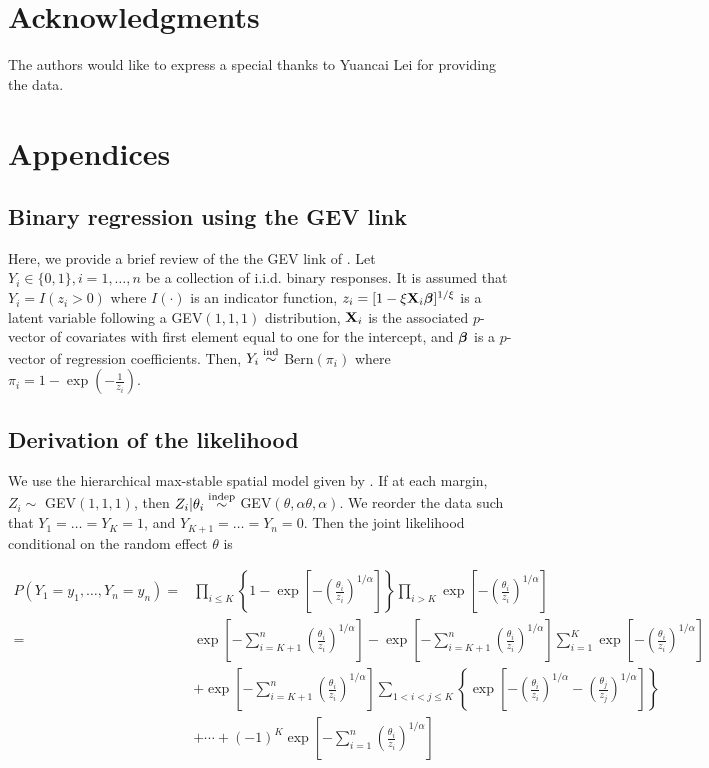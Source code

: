 \documentclass[12pt]{article}
\begin{document}
\section*{Acknowledgments}
The authors would like to express a special thanks to Yuancai Lei for providing the data.

\appendix
\section{Appendices}
\subsection{Binary regression using the GEV link} \label{rba:rarebinary}
Here, we provide a brief review of the the GEV link of \citet{Wang2010}.
Let $Y_i \in \{0, 1\}, i = 1, \ldots, n$ be a collection of i.i.d. binary responses.
It is assumed that $Y_i = I(z_i > 0)$ where $I(\cdot)$ is an indicator function, $z_i = [1 - \xi \mathbf{X}_i \mbox{\boldmath $\beta$}]^{1 / \xi}$ is a latent variable following a GEV$(1, 1, 1)$ distribution, $\mathbf{X}_i$ is the associated $p$-vector of covariates with first element equal to one for the intercept, and $\mbox{\boldmath $\beta$}$ is a $p$-vector of regression coefficients.
Then, $Y_i \stackrel{\mathrm{ind}}{\sim}$ Bern$(\pi_i)$ where $\pi_i= 1 - \exp \left( -\frac{ 1 }{ z_i } \right)$.


\subsection{Derivation of the likelihood} \label{rba:likelihoodderivation}
We use the hierarchical max-stable spatial model given by \citet{Reich2012}. If at each margin, $Z_i \sim $ GEV$(1,1,1)$, then $Z_i | \theta_i \stackrel{\text{indep}}{\sim} $ GEV$(\theta, \alpha \theta, \alpha)$. We reorder the data such that $Y_1=\ldots=Y_K=1$, and $Y_{K+1} = \ldots = Y_n = 0$. Then the joint likelihood conditional on the random effect $\theta$ is

\begin{align} \label{rbeq:joint_cond}
	P(Y_1=y_1,\ldots,Y_n=y_n) =& \prod_{ i \le K } \left\{ 1 - \exp \left[ - \left( \frac{ \theta_i }{ z_i } \right)^{ 1/\alpha} \right] \right \} \prod_{ i > K } \exp \left[ -\left( \frac{ \theta_i }{ z_i } \right)^{1/\alpha} \right] \nonumber \\[0.5em]
		=& \exp \left[ -\sum_{ i = K+1}^{ n }\left( \frac{ \theta_i }{ z_i } \right)^{1/\alpha} \right] - \exp \left[ -\sum_{ i = K+1}^{ n }\left( \frac{ \theta_i }{ z_i } \right)^{1/\alpha} \right] \sum_{ i = 1}^{K} \exp\left[ -\left( \frac{ \theta_i }{ z_i } \right)^{ 1/\alpha} \right] \nonumber\\
		&  + \exp \left[ -\sum_{ i = K+1}^{ n }\left( \frac{ \theta_i }{ z_i } \right)^{1/\alpha} \right] \sum_{ 1 < i < j \le K } \left\{ \exp \left[ - \left( \frac{ \theta_i }{ z_i } \right)^{ 1/\alpha} - \left( \frac{ \theta_j }{ z_j } \right)^{ 1/\alpha } \right] \right \} \nonumber \\[0.5em]
		& + \cdots + (-1)^K \exp\left[ - \sum_{ i = 1 }^{ n }\left( \frac{ \theta_i }{ z_i } \right)^{ 1/\alpha} \right]
\end{align}
\end{document}
